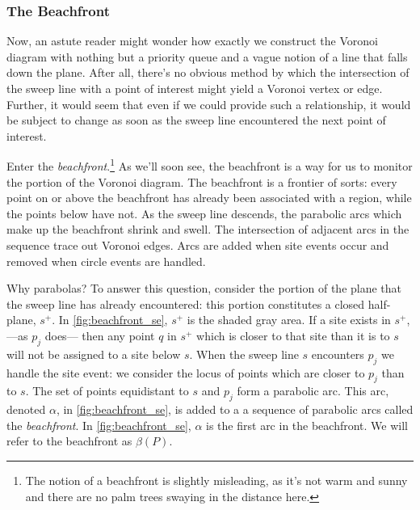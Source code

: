 \documentclass[12pt,twoside]{reedthesis}
\begin{document}

      \subsubsection{The Beachfront} %
      \label{ssub:the_beachfront}
        Now, an astute reader might wonder how exactly we construct the Voronoi diagram with nothing but a priority queue and a vague notion of a line that falls down the plane. After all, there's no obvious method by which the intersection of the sweep line with a point of interest might yield a Voronoi vertex or edge. Further, it would seem that even if we could provide such a relationship, it would be subject to change as soon as the sweep line encountered the next point of interest. \par

        Enter the \emph{beachfront}.\footnote{The notion of a beachfront is slightly misleading, as it's not warm and sunny and there are no palm trees swaying in the distance here.} As we'll soon see, the beachfront is a way for us to monitor the  portion of the Voronoi diagram. The beachfront is a frontier of sorts: every point on or above the beachfront has already been associated with a region, while the points below have not. As the sweep line descends, the parabolic arcs which make up the beachfront shrink and swell. The intersection of adjacent arcs in the sequence trace out Voronoi edges. Arcs are added when site events occur and removed when circle events are handled.\par

        Why parabolas? To answer this question, consider the portion of the plane that the sweep line has already encountered: this portion constitutes a closed half-plane, $s^+$. In \cref{fig:beachfront_se}, $s^+$ is the shaded gray area. If a site exists in $s^+$,---as $p_{j}$ does--- then any point $q$ in $s^+$ which is closer to that site than it is to $s$ will not be assigned to a site below $s$. When the sweep line $s$ encounters $p_{j}$ we handle the site event: we consider the locus of points which are closer to $p_{j}$ than to $s$. The set of points equidistant to $s$ and $p_{j}$ form a parabolic arc. This arc, denoted $\alpha$, in \cref{fig:beachfront_se}, is added to a a sequence of parabolic arcs called the \emph{beachfront}. In \cref{fig:beachfront_se}, $\alpha$ is the first arc in the beachfront. We will refer to the beachfront as $\beta(P)$. \par
\end{document}
